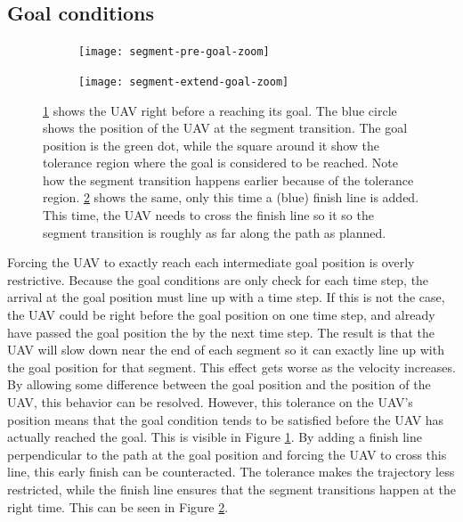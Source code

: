 \subsection{Goal conditions}
\label{subsec:goal-cond}

\begin{figure}
	\centering
	\begin{subfigure}[t]{0.45\columnwidth}
        		\texttt{[image: segment-pre-goal-zoom]}
        		\caption{}
        		 \label{fig:goal-ext-pre}
	\end{subfigure}	
		\hfil
	\begin{subfigure}[t]{0.45\columnwidth}
        		\texttt{[image: segment-extend-goal-zoom]}
        		\caption{}
        		\label{fig:goal-ext-post}
	\end{subfigure}
    \caption{\ref{fig:goal-ext-pre} shows the UAV right before a reaching its goal. The blue circle shows the position of the UAV at the segment transition. The goal position is the green dot, while the square around it show the tolerance region where the goal is considered to be reached. Note how the segment transition happens earlier because of the tolerance region. \ref{fig:goal-ext-post} shows the same, only this time a (blue) finish line is added. This time, the UAV needs to cross the finish line so it so the segment transition is roughly as far along the path as planned.}
    \label{fig:goal-ext}     
\end{figure}
Forcing the UAV to exactly reach each intermediate goal position is overly restrictive. Because the goal conditions are only check for each time step, the arrival at the goal position must line up with a time step. If this is not the case, the UAV could be right before the goal position on one time step, and already have passed the goal position the by the next time step. The result is that the UAV will slow down near the end of each segment so it can exactly line up with the goal position for that segment. This effect gets worse as the velocity increases.
\\
By allowing some difference between the goal position and the position of the UAV, this behavior can be resolved. However, this tolerance on the UAV's position means that the goal condition tends to be satisfied before the UAV has actually reached the goal. This is visible in Figure \ref{fig:goal-ext-pre}. By adding a finish line perpendicular to the path at the goal position and forcing the UAV to cross this line, this early finish can be counteracted. The tolerance makes the trajectory less restricted, while the finish line ensures that the segment transitions happen at the right time. This can be seen in Figure \ref{fig:goal-ext-post}.

